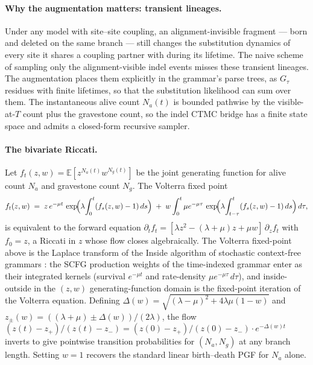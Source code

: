 \documentclass[11pt]{article}
\theoremstyle{definition}
\theoremstyle{remark}
\newcommand{\E}{\mathbb{E}}
\begin{document}
\paragraph{Why the augmentation matters: transient lineages.}
Under any model with site--site coupling, an alignment-invisible
fragment --- born and deleted on the same branch --- still changes
the substitution dynamics of every site it shares a coupling
partner with during its lifetime. The naive scheme of sampling only
the alignment-visible indel events misses these transient lineages.
The augmentation places them explicitly in the grammar's parse
trees, as $G_\tau$ residues with finite lifetimes, so that the
substitution likelihood can sum over them. The instantaneous alive
count $N_a(t)$ is bounded pathwise by the visible-at-$T$ count plus
the gravestone count, so the indel CTMC bridge has a finite state
space and admits a closed-form recursive sampler.

\paragraph{The bivariate Riccati.}
Let $f_t(z, w) = \E[z^{N_a(t)} w^{N_g(t)}]$ be the joint generating
function for alive count $N_a$ and gravestone count $N_g$.
The Volterra fixed point
\begin{equation}
f_t(z, w)
  \;=\; z\, e^{-\mu t}\, \exp\!\Bigl(\lambda \!\int_0^t (f_s(z,w) - 1)\, ds\Bigr)
  \;+\; w \int_0^t \mu e^{-\mu \tau}\, \exp\!\Bigl(\lambda \!\int_{t-\tau}^{t} (f_s(z, w) - 1)\, ds\Bigr)\, d\tau,
\end{equation}
is equivalent to the forward equation
$\partial_t f_t = [\lambda z^2 - (\lambda+\mu) z + \mu w]\, \partial_z f_t$
with $f_0 = z$, a Riccati in $z$ whose flow closes algebraically.
The Volterra fixed-point above is the Laplace transform of the Inside
algorithm of stochastic context-free grammars
\citep{KnudsenHein1999,Rivas2008,HolmesRubin2002psb}: the SCFG production
weights of the time-indexed grammar enter as their integrated kernels
(survival $e^{-\mu t}$ and rate-density $\mu e^{-\mu \tau}\,d\tau$), and
inside-outside in the $(z,w)$ generating-function domain is the
fixed-point iteration of the Volterra equation.
Defining $\Delta(w) = \sqrt{(\lambda-\mu)^2 + 4 \lambda \mu (1 - w)}$
and $z_\pm(w) = ((\lambda+\mu) \pm \Delta(w)) / (2 \lambda)$, the
flow $(z(t) - z_+) / (z(t) - z_-) = (z(0) - z_+) / (z(0) - z_-) \cdot e^{-\Delta(w) t}$
inverts to give pointwise transition probabilities for $(N_a, N_g)$
at any branch length. Setting $w = 1$ recovers the standard linear
birth--death PGF for $N_a$ alone.
\end{document}
